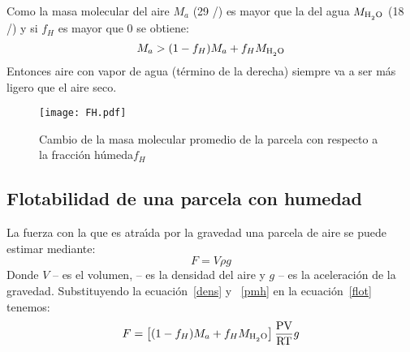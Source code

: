 Como la masa molecular del aire $M_a$ (29 \gram/\mole) es mayor que la del agua $M_{\ce{H2O}}$  (18 \gram/\mole) y si  $f_H$ es mayor que $0$ se obtiene:
 \begin{equation}
M_a> (1-f_H)M_a + f_H M_{\ce{H2O}}
\label{rel1}
\end{equation}
Entonces aire con vapor de agua (t\'ermino de la derecha) siempre va a ser m\'as ligero que el aire seco.
\begin{figure}[htbp]
\begin{center}
\texttt{[image: FH.pdf]}

\caption[Peso molecular aire-agua]{Cambio de la masa molecular promedio de la parcela con respecto a  la fracci\'on h\'umeda$f_H$ }
\label{fig_fh}
\end{center}
\end{figure}

\subsection{Flotabilidad de una parcela con humedad}\label{flopa}

La fuerza con la que es atra\'{\i}da por la gravedad una parcela de aire se puede estimar mediante:
\begin{equation}
F=V\rho g
\label{flot}
\end{equation}
Donde $V$ -- es el volumen,  -- es la densidad del aire y $g$  --  es la aceleraci\'on de la gravedad. Substituyendo la  ecuaci\'on~\ref{dens} y ~\ref{pmh} en la ecuaci\'on~\ref{flot} tenemos:
\begin{equation}
F=\left[  (1-f_H)M_a + f_H M_{\ce{H2O}}\right] \frac{\textrm{PV}}{\textrm{RT}}g
\label{fb}
\end{equation}

